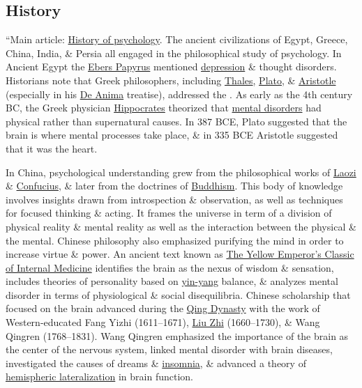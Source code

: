 \documentclass[oneside]{book}
\numberwithin{equation}{section}
\begin{document}
\subsection{History}
``Main article: \href{https://en.wikipedia.org/wiki/History_of_psychology}{History of psychology}. The ancient civilizations of Egypt, Greece, China, India, \& Persia all engaged in the philosophical study of psychology. In Ancient Egypt the \href{https://en.wikipedia.org/wiki/Ebers_papyrus}{Ebers Papyrus} mentioned \href{https://en.wikipedia.org/wiki/Clinical_depression}{depression} \& thought disorders. Historians note that Greek philosophers, including \href{https://en.wikipedia.org/wiki/Thales}{Thales}, \href{https://en.wikipedia.org/wiki/Plato}{Plato}, \& \href{https://en.wikipedia.org/wiki/Aristotle}{Aristotle} (especially in his \href{https://en.wikipedia.org/wiki/On_the_Soul}{De Anima} treatise), addressed the . As early as the 4th century BC, the Greek physician \href{https://en.wikipedia.org/wiki/Hippocrates}{Hippocrates} theorized that \href{https://en.wikipedia.org/wiki/Mental_disorder}{mental disorders} had physical rather than supernatural causes. In 387 BCE, Plato suggested that the brain is where mental processes take place, \& in 335 BCE Aristotle suggested that it was the heart.

In China, psychological understanding grew from the philosophical works of \href{https://en.wikipedia.org/wiki/Laozi}{Laozi} \& \href{https://en.wikipedia.org/wiki/Confucius}{Confucius}, \& later from the doctrines of \href{https://en.wikipedia.org/wiki/Buddhism}{Buddhism}. This body of knowledge involves insights drawn from introspection \& observation, as well as techniques for focused thinking \& acting. It frames the universe in term of a division of physical reality \& mental reality as well as the interaction between the physical \& the mental. Chinese philosophy also emphasized purifying the mind in order to increase virtue \& power. An ancient text known as \href{https://en.wikipedia.org/wiki/Huangdi_Neijing}{The Yellow Emperor's Classic of Internal Medicine} identifies the brain as the nexus of wisdom \& sensation, includes theories of personality based on \href{https://en.wikipedia.org/wiki/Yin_and_yang}{yin-yang} balance, \& analyzes mental disorder in terms of physiological \& social disequilibria. Chinese scholarship that focused on the brain advanced during the \href{https://en.wikipedia.org/wiki/Qing_Dynasty}{Qing Dynasty} with the work of Western-educated Fang Yizhi (1611--1671), \href{https://en.wikipedia.org/wiki/Liu_Zhi_(scholar)}{Liu Zhi} (1660--1730), \& Wang Qingren (1768--1831). Wang Qingren emphasized the importance of the brain as the center of the nervous system, linked mental disorder with brain diseases, investigated the causes of dreams \& \href{https://en.wikipedia.org/wiki/Insomnia}{insomnia}, \& advanced a theory of \href{https://en.wikipedia.org/wiki/Lateralization_of_brain_function}{hemispheric lateralization} in brain function.
\end{document}
